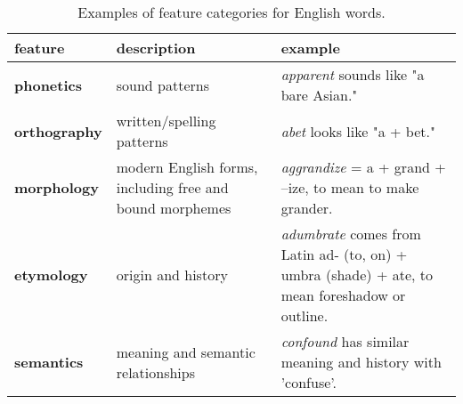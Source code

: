 \begin{table*}[!htb]
\centering
\caption{Examples of feature categories for English words.}
\label{tab:linguistic-features}
\begin{tabularx}{\textwidth}{l >{\raggedright\arraybackslash}X >{\raggedright\arraybackslash}X}
\toprule
\textbf{feature} & \textbf{description} & \textbf{example} \\
\midrule
\textbf{phonetics} & sound patterns & \emph{apparent} sounds like "a bare Asian." \\
\addlinespace
\textbf{orthography} & written/spelling patterns & \emph{abet} looks like "a + bet." \\
\addlinespace
\textbf{morphology} & modern English forms, including free and bound morphemes & \emph{aggrandize} = a + grand + –ize, to mean to make grander. \\
\addlinespace
\textbf{etymology} & origin and history & \emph{adumbrate} comes from Latin ad- (to, on) + umbra (shade) + ate, to mean foreshadow or outline. \\
\addlinespace
\textbf{semantics} & meaning and semantic relationships & \emph{confound} has similar meaning and history with 'confuse'. \\
\bottomrule
\end{tabularx}
\end{table*}
